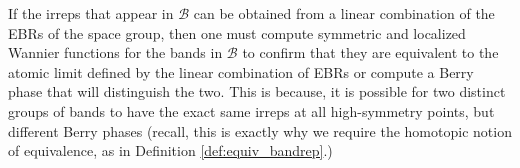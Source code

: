 If the irreps that appear in $\mathcal{B}$ can be obtained from a linear combination of the EBRs of the space group, then one must compute symmetric and localized Wannier functions for the bands in $\mathcal{B}$ to confirm that they are equivalent to the atomic limit defined by the linear combination of EBRs or compute a Berry phase that will distinguish the two. This is because, it is possible for two distinct groups of bands to have the exact same irreps at all high-symmetry points, but different Berry phases (recall, this is exactly why we require the homotopic notion of equivalence, as in Definition \ref{def:equiv_bandrep}.)



%




